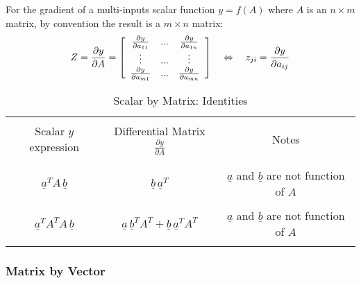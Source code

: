 For the gradient of a multi-inputs scalar function $y = f( A )$ where $A$ is an $n \times m$ matrix, by convention the result is a $m \times n$ matrix:
\begin{align}
 Z = \frac{\partial y}{\partial A} =
 \left[ \begin{array}{c c c }
         \frac{\partial y}{\partial a_{11}}   & ... & \frac{\partial y}{\partial a_{1n}} \\
         \vdots                             & ... & \vdots                          \\
         \frac{\partial y}{\partial a_{m1}}   & ... & \frac{\partial y}{\partial a_{mn}} \\
 \end{array} \right]
 \quad\Leftrightarrow\quad
 z_{ji} = \frac{\partial y}{\partial a_{ij}}
\end{align}

\begin{table}[H]
 \centering
 \caption{ Scalar by Matrix: Identities}
 \label{scavec}
 \begin{tabular}{ | c | c | c |}
  \hline \hline & & \\
  Scalar $y$ expression & Differential Matrix $\frac{\partial y}{\partial A}$  & Notes \\ & & \\
  \hline \hline & & \\
  $ \underline{a}^T A \, \underline{b} $ &
  $ \underline{b} \, \underline{a}^T   $ &    $\underline{a}$ and  $\underline{b}$ are not function of $A$
  \\ & & \\
  $ \underline{a}^T A^T A \, \underline{b} $ &
  $ \underline{a} \, \underline{b}^T A^T + \underline{b} \, \underline{a}^T  A^T  $ &    $\underline{a}$ and  $\underline{b}$ are not function of $A$
  \\ & & \\
  \hline
 \end{tabular}
\end{table}


\subsubsection{Matrix by Vector}

